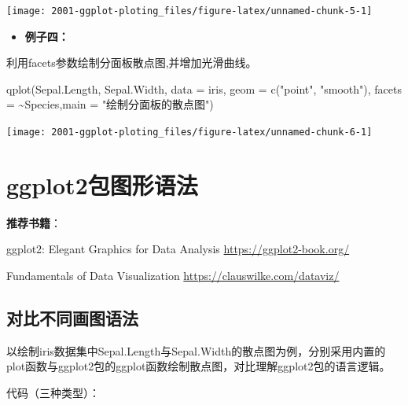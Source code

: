 \documentclass[
]{book}
\newenvironment{Shaded}{\begin{snugshade}}{\end{snugshade}}
\newcommand{\AttributeTok}[1]{\textcolor[rgb]{0.77,0.63,0.00}{#1}}
\newcommand{\FunctionTok}[1]{\textcolor[rgb]{0.00,0.00,0.00}{#1}}
\newcommand{\NormalTok}[1]{#1}
\newcommand{\SpecialCharTok}[1]{\textcolor[rgb]{0.00,0.00,0.00}{#1}}
\newcommand{\StringTok}[1]{\textcolor[rgb]{0.31,0.60,0.02}{#1}}
\providecommand{\tightlist}{%
  \setlength{\itemsep}{0pt}\setlength{\parskip}{0pt}}
\begin{document}
\begin{center}\texttt{[image: 2001-ggplot-ploting\_files/figure-latex/unnamed-chunk-5-1]} \end{center}

\begin{itemize}
\tightlist
\item
  \textbf{例子四：}
\end{itemize}

利用facets参数绘制分面板散点图,并增加光滑曲线。

\begin{Shaded}
\begin{Highlighting}[]
\FunctionTok{qplot}\NormalTok{(Sepal.Length, Sepal.Width, }\AttributeTok{data =}\NormalTok{ iris, }\AttributeTok{geom =} \FunctionTok{c}\NormalTok{(}\StringTok{"point"}\NormalTok{, }\StringTok{"smooth"}\NormalTok{),}
      \AttributeTok{facets =} \SpecialCharTok{\textasciitilde{}}\NormalTok{Species,}\AttributeTok{main =} \StringTok{"绘制分面板的散点图"}\NormalTok{)}
\end{Highlighting}
\end{Shaded}

\begin{center}\texttt{[image: 2001-ggplot-ploting\_files/figure-latex/unnamed-chunk-6-1]} \end{center}

\hypertarget{ggplot2ux5305ux56feux5f62ux8bedux6cd5}{%
\section{ggplot2包图形语法}\label{ggplot2ux5305ux56feux5f62ux8bedux6cd5}}

\textbf{推荐书籍}：

ggplot2: Elegant Graphics for Data Analysis \url{https://ggplot2-book.org/}

Fundamentals of Data Visualization \url{https://clauswilke.com/dataviz/}

\hypertarget{ux5bf9ux6bd4ux4e0dux540cux753bux56feux8bedux6cd5}{%
\subsection{对比不同画图语法}\label{ux5bf9ux6bd4ux4e0dux540cux753bux56feux8bedux6cd5}}

以绘制iris数据集中Sepal.Length与Sepal.Width的散点图为例，分别采用内置的plot函数与ggplot2包的ggplot函数绘制散点图，对比理解ggplot2包的语言逻辑。

代码（三种类型）：
\end{document}
